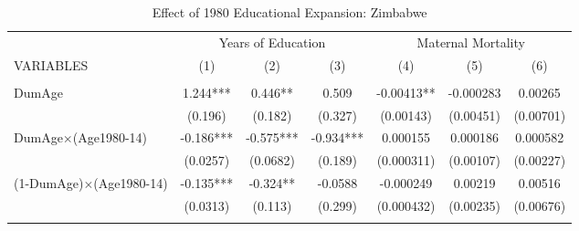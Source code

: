 \begin{landscape}\begin{table}[htpb!]\begin{center}
\caption{Effect of 1980 Educational Expansion: Zimbabwe}
\label{MMRtab:Zimbabwe}\begin{tabular}{lcccccc}\toprule
& \multicolumn{3}{c}{Years of Education}&\multicolumn{3}{c}{Maternal Mortality }\\VARIABLES & (1)&(2)&(3)&(4)&(5)&(6)\\ \cmidrule(r){1-4} \cmidrule(r){5-7}\begin{footnotesize}\end{footnotesize}&\begin{footnotesize}\end{footnotesize}&\begin{footnotesize}\end{footnotesize}&\begin{footnotesize}\end{footnotesize}&\begin{footnotesize}\end{footnotesize}&\begin{footnotesize}\end{footnotesize}\\ 
DumAge&1.244***&0.446**&0.509&-0.00413**&-0.000283&0.00265\\
&(0.196)&(0.182)&(0.327)&(0.00143)&(0.00451)&(0.00701)\\
DumAge$\times$(Age1980-14)&-0.186***&-0.575***&-0.934***&0.000155&0.000186&0.000582\\
&(0.0257)&(0.0682)&(0.189)&(0.000311)&(0.00107)&(0.00227)\\
(1-DumAge)$\times$(Age1980-14)&-0.135***&-0.324**&-0.0588&-0.000249&0.00219&0.00516\\
&(0.0313)&(0.113)&(0.299)&(0.000432)&(0.00235)&(0.00676)\\
\begin{footnotesize}\end{footnotesize}&\begin{footnotesize}\end{footnotesize}&\begin{footnotesize}\end{footnotesize}&\begin{footnotesize}\end{footnotesize}&\begin{footnotesize}\end{footnotesize}&\begin{footnotesize}\end{footnotesize}\\ 

\end{tabular}
\end{center}
\end{table}
\end{landscape}
